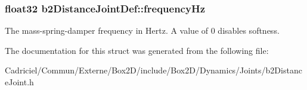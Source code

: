 \subsubsection[{\texorpdfstring{frequency\+Hz}{frequencyHz}}]{\setlength{\rightskip}{0pt plus 5cm}float32 b2\+Distance\+Joint\+Def\+::frequency\+Hz}\hypertarget{structb2_distance_joint_def_a35e2362bcb6c58734f95d0ac045863ea}{}\label{structb2_distance_joint_def_a35e2362bcb6c58734f95d0ac045863ea}
The mass-\/spring-\/damper frequency in Hertz. A value of 0 disables softness. 

The documentation for this struct was generated from the following file\+:\begin{DoxyCompactItemize}
\item 
Cadriciel/\+Commun/\+Externe/\+Box2\+D/include/\+Box2\+D/\+Dynamics/\+Joints/b2\+Distance\+Joint.\+h\end{DoxyCompactItemize}
